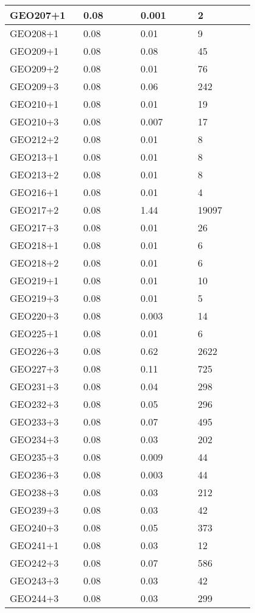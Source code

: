 \begin{longtable}[H]{|p{0.2\linewidth}|p{0.2\linewidth}|p{0.2\linewidth}|p{0.2\linewidth}|}
\hline
GEO207+1 & 0.08 & 0.001 & 2  \\
\hline
GEO208+1 & 0.08 & 0.01 & 9 \\
\hline
GEO209+1 & 0.08 & 0.08 & 45 \\
\hline
GEO209+2 & 0.08 & 0.01 & 76 \\
\hline
GEO209+3 & 0.08 & 0.06 & 242 \\
\hline
GEO210+1 & 0.08 & 0.01 & 19 \\
\hline
GEO210+3 & 0.08 & 0.007 & 17 \\
\hline
GEO212+2 & 0.08 & 0.01 & 8 \\
\hline
GEO213+1 & 0.08 & 0.01 & 8 \\
\hline
GEO213+2 & 0.08 & 0.01 & 8 \\
\hline
GEO216+1 & 0.08 & 0.01 & 4 \\
\hline
GEO217+2 & 0.08 & 1.44 & 19097 \\
\hline
GEO217+3 & 0.08 & 0.01 & 26 \\
\hline
GEO218+1 & 0.08 & 0.01 & 6 \\
\hline
GEO218+2 & 0.08 & 0.01 & 6 \\
\hline
GEO219+1 & 0.08 & 0.01 & 10 \\
\hline
GEO219+3 & 0.08 & 0.01 & 5 \\
\hline
GEO220+3 & 0.08 & 0.003 & 14 \\
\hline
GEO225+1 & 0.08 & 0.01 & 6 \\
\hline
GEO226+3 & 0.08 & 0.62 & 2622 \\
\hline
GEO227+3 & 0.08 & 0.11 & 725 \\
\hline
GEO231+3 & 0.08 & 0.04 & 298 \\
\hline
GEO232+3 & 0.08 & 0.05 & 296 \\
\hline
GEO233+3 & 0.08 & 0.07 & 495 \\
\hline
GEO234+3 & 0.08 & 0.03 & 202 \\
\hline
GEO235+3 & 0.08 & 0.009 & 44 \\
\hline
GEO236+3 & 0.08 & 0.003 & 44 \\
\hline
GEO238+3 & 0.08 & 0.03 & 212 \\
\hline
GEO239+3 & 0.08 & 0.03 & 42 \\
\hline
GEO240+3 & 0.08 & 0.05 & 373 \\
\hline
GEO241+1 & 0.08 & 0.03 & 12 \\
\hline
GEO242+3 & 0.08 & 0.07 & 586 \\
\hline
GEO243+3 & 0.08 & 0.03 & 42 \\
\hline 
GEO244+3 & 0.08 & 0.03 & 299 \\

\end{longtable}
